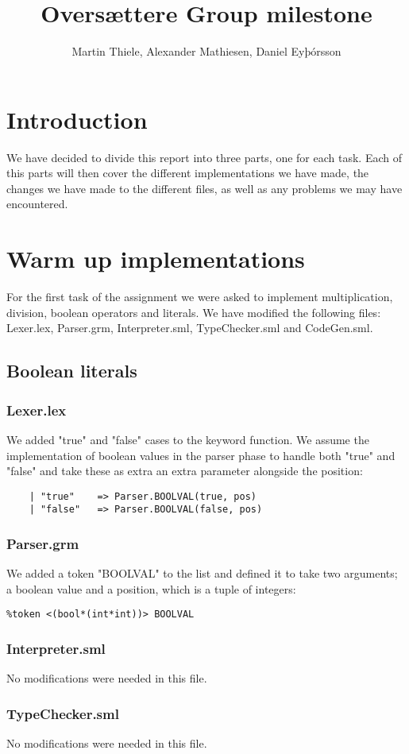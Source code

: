 \documentclass[12pt]{article}
\title{Oversættere Group milestone}
\author{Martin Thiele, Alexander Mathiesen, Daniel Eyþórsson}
\date{\parbox{\linewidth}{\centering%
  15. december 2015\endgraf\bigskip
  Studienummer: mqn507, pkq530, kzs773\endgraf\medskip
  Email: <Studienummer> @alumni.ku.dk\\
  Oversættere \endgraf}}
\begin{document}
\maketitle

\section{Introduction}
We have decided to divide this report into three parts, one for each task. Each of this parts will then cover the different implementations we have made, the changes we have made to the different files, as well as any problems we may have encountered.
\section{Warm up implementations}
For the first task of the assignment we were asked to implement multiplication, division, boolean operators and literals. We have modified the following files: Lexer.lex, Parser.grm, Interpreter.sml, TypeChecker.sml and CodeGen.sml.
\subsection{Boolean literals}
\subsubsection{Lexer.lex}
We added "true" and "false" cases to the keyword function. We assume the implementation of boolean values in the parser phase to handle both "true" and "false" and take these as extra an extra parameter alongside the position:
\begin{verbatim}
    | "true"    => Parser.BOOLVAL(true, pos)
    | "false"   => Parser.BOOLVAL(false, pos)
\end{verbatim}
\subsubsection{Parser.grm}
We added a token "BOOLVAL" to the list and defined it to take two arguments; a boolean value and a position, which is a tuple of integers:
\begin{verbatim}
%token <(bool*(int*int))> BOOLVAL
\end{verbatim}
\subsubsection{Interpreter.sml}
No modifications were needed in this file. 
\subsubsection{TypeChecker.sml}
No modifications were needed in this file.
\end{document}
